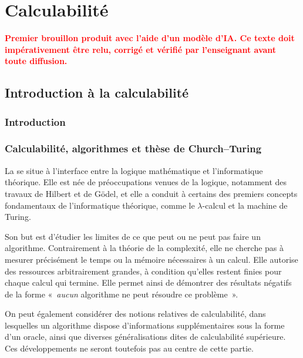 \chapter{Calculabilité}\label{chapter-computability}

\begin{center}
\textcolor{red}{\textbf{Premier brouillon produit avec l'aide d'un
modèle d'IA.  Ce texte doit impérativement être relu, corrigé et
vérifié par l'enseignant avant toute diffusion.}}
\end{center}

\section{Introduction à la calculabilité}

\subsection{Introduction}\label{subsection-computability-introduction}

\subsection{Calculabilité, algorithmes et thèse de Church--Turing}

\thingy La  se situe à l'interface entre la logique
mathématique et l'informatique théorique.  Elle est née de
préoccupations venues de la logique, notamment des travaux de Hilbert
et de Gödel, et elle a conduit à certains des premiers concepts
fondamentaux de l'informatique théorique, comme le $\lambda$-calcul et
la machine de Turing.

Son but est d'étudier les limites de ce que peut ou ne peut pas faire
un algorithme.  Contrairement à la théorie de la complexité, elle ne
cherche pas à mesurer précisément le temps ou la mémoire nécessaires à
un calcul.  Elle autorise des ressources arbitrairement grandes, à
condition qu'elles restent finies pour chaque calcul qui termine.  Elle
permet ainsi de démontrer des résultats négatifs de la forme
« \emph{aucun} algorithme ne peut résoudre ce problème ».

On peut également considérer des notions relatives de calculabilité,
dans lesquelles un algorithme dispose d'informations supplémentaires
sous la forme d'un oracle, ainsi que diverses généralisations dites de
calculabilité supérieure.  Ces développements ne seront toutefois pas
au centre de cette partie.

